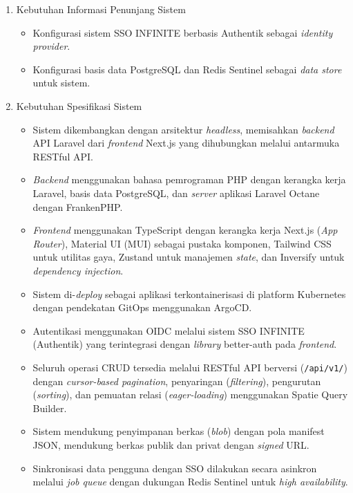 \begin{enumerate}[listparindent=1cm]
            \begin{enumerate}[label=\alph*.]
                  \item Kebutuhan Informasi Penunjang Sistem
                        \begin{itemize}
                              \item Konfigurasi sistem SSO INFINITE berbasis Authentik sebagai \textit{identity provider}.
                              \item Konfigurasi basis data PostgreSQL dan Redis Sentinel sebagai \textit{data store} untuk sistem.
                        \end{itemize}
                  \item Kebutuhan Spesifikasi Sistem
                        \begin{itemize}
                              \item Sistem dikembangkan dengan arsitektur \textit{headless}, memisahkan \textit{backend} API Laravel dari \textit{frontend} Next.js yang dihubungkan melalui antarmuka RESTful API.
                              \item \textit{Backend} menggunakan bahasa pemrograman PHP dengan kerangka kerja Laravel, basis data PostgreSQL, dan \textit{server} aplikasi Laravel Octane dengan FrankenPHP.
                              \item \textit{Frontend} menggunakan TypeScript dengan kerangka kerja Next.js (\textit{App Router}), Material UI (MUI) sebagai pustaka komponen, Tailwind CSS untuk utilitas gaya, Zustand untuk manajemen \textit{state}, dan Inversify untuk \textit{dependency injection}.
                              \item Sistem di-\textit{deploy} sebagai aplikasi terkontainerisasi di platform Kubernetes dengan pendekatan GitOps menggunakan ArgoCD.
                              \item Autentikasi menggunakan OIDC melalui sistem SSO INFINITE (Authentik) yang terintegrasi dengan \textit{library} better-auth pada \textit{frontend}.
                              \item Seluruh operasi CRUD tersedia melalui RESTful API berversi (\texttt{/api/v1/}) dengan \textit{cursor-based pagination}, penyaringan (\textit{filtering}), pengurutan (\textit{sorting}), dan pemuatan relasi (\textit{eager-loading}) menggunakan Spatie Query Builder.
                              \item Sistem mendukung penyimpanan berkas (\textit{blob}) dengan pola manifest JSON, mendukung berkas publik dan privat dengan \textit{signed} URL.
                              \item Sinkronisasi data pengguna dengan SSO dilakukan secara asinkron melalui \textit{job queue} dengan dukungan Redis Sentinel untuk \textit{high availability}.
                        \end{itemize}
            \end{enumerate}
\end{enumerate}


